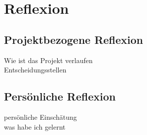 
\section{Reflexion}
\subsection{Projektbezogene Reflexion}
Wie ist das Projekt verlaufen\\
Entscheidungsstellen\\

\subsection{Persönliche Reflexion}
persönliche Einschätung\\
was habe ich gelernt\\
